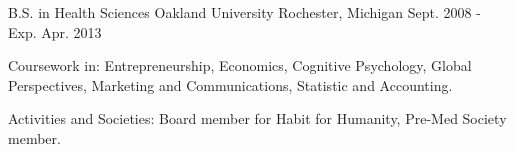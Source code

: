 

\begin{cventries}


  \cventry
    {B.S. in Health Sciences} %
    {Oakland University} %
    {Rochester, Michigan} %
    {Sept. 2008 - Exp. Apr. 2013} %
    {
      \begin{cvitems} %
        \item {Coursework in: Entrepreneurship, Economics, Cognitive Psychology, Global Perspectives, Marketing and Communications, Statistic and Accounting. }
        \item {Activities and Societies: Board member for Habit for Humanity, Pre-Med Society member.}
      \end{cvitems}
    }

\end{cventries}
